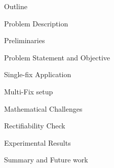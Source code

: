 \begin{frame}{\large Outline}
\bi
	\item Problem Description
	\item Preliminaries
	\item Problem Statement and Objective
	\item Single-fix Application
	\item Multi-Fix setup
	\bi
		\item Mathematical Challenges
	\ei
	\item Rectifiability Check
	\item Experimental Results
	\item Summary and Future work
\ei
\end{frame}

